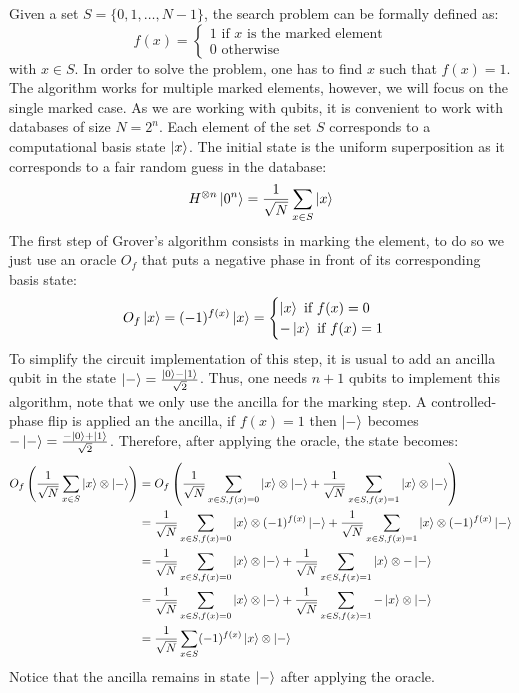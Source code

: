 \documentclass{article}
\begin{document}
Given a set $S=\{0,1,\dots,N-1\}$, the search problem can be formally defined as:
\begin{equation*}
    f(x) = \begin{cases}
    1 \text{ if } x \text{ is the marked element} \\
    0 \text{ otherwise }
    \end{cases}
\end{equation*}
with $x\in S$. In order to solve the problem, one has to find $x$ such that $f(x)=1$. The algorithm works for multiple marked elements, however, we will focus on the single marked case. As we are working with qubits, it is convenient to work with databases of size $N=2^n$. Each element of the set $S$ corresponds to a computational basis state $\ket{x}$. The initial state is the uniform superposition as it corresponds to a fair random guess in the database:
\begin{equation}\label{eq:grover}
    H^{\otimes n}\ket{0^n} = \frac{1}{\sqrt{N}}\sum_{x\in S}\ket{x}
\end{equation}
The first step of Grover's algorithm consists in marking the element, to do so we just use an oracle $O_f$ that puts a negative phase in front of its corresponding basis state:
\begin{equation*}
    O_f\ket{x} = (-1)^{f(x)}\ket{x}=\begin{cases}
        \ket{x} \text{ if } f(x)=0 \\
        -\ket{x} \text{ if } f(x)=1
    \end{cases}
\end{equation*}
To simplify the circuit implementation of this step, it is usual to add an ancilla qubit in the state $\ket{-}=\frac{\ket{0}-\ket{1}}{\sqrt{2}}$. Thus, one needs $n+1$ qubits to implement this algorithm, note that we only use the ancilla for the marking step. A controlled-phase flip is applied an the ancilla, if $f(x)=1$ then $\ket{-}$ becomes $-\ket{-}=\frac{-\ket{0}+\ket{1}}{\sqrt{2}}$. Therefore, after applying the oracle, the state becomes:
\begin{equation*}
    \begin{split}
        O_f\left(\frac{1}{\sqrt{N}}\sum_{x\in S}\ket{x}\otimes\ket{-}\right) &= O_f\left(\frac{1}{\sqrt{N}}\sum_{x\in S,f(x)=0}\ket{x}\otimes\ket{-}+\frac{1}{\sqrt{N}}\sum_{x\in S,f(x)=1}\ket{x}\otimes\ket{-}\right) \\
        &= \frac{1}{\sqrt{N}}\sum_{x\in S,f(x)=0}\ket{x}\otimes (-1)^{f(x)}\ket{-}+\frac{1}{\sqrt{N}}\sum_{x\in S,f(x)=1}\ket{x}\otimes(-1)^{f(x)}\ket{-} \\
        &= \frac{1}{\sqrt{N}}\sum_{x\in S,f(x)=0}\ket{x}\otimes\ket{-}+\frac{1}{\sqrt{N}}\sum_{x\in S,f(x)=1}\ket{x}\otimes-\ket{-} \\
        &= \frac{1}{\sqrt{N}}\sum_{x\in S,f(x)=0}\ket{x}\otimes\ket{-}+\frac{1}{\sqrt{N}}\sum_{x\in S,f(x)=1}-\ket{x}\otimes\ket{-} \\
        &= \frac{1}{\sqrt{N}}\sum_{x\in S}(-1)^{f(x)}\ket{x}\otimes \ket{-}
    \end{split}
\end{equation*}
Notice that the ancilla remains in state $\ket{-}$ after applying the oracle.
\end{document}
